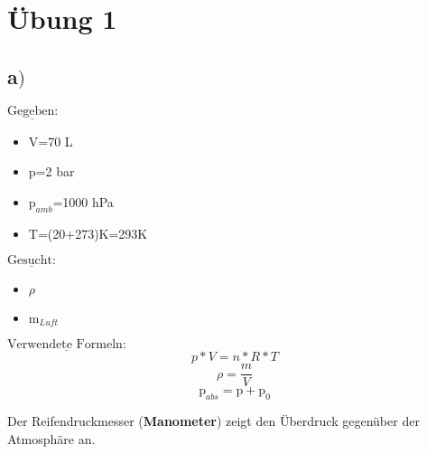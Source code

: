 \section{Übung 1}
\subsection*{a$)$}

\begin{minipage}[t]{0.33\textwidth}
$\underline{\text{Gegeben:}}$
\begin{itemize}
	\item V=70 \si{\liter}
	\item p=2 \si{\bar}
	\item $\text{p}_{amb}$=1000 \si{\hecto\pascal}
	\item T=(20+273)\si{\kelvin}=293\si{\kelvin}
\end{itemize}
\end{minipage}
\begin{minipage}[t]{0.33\textwidth}
	$\underline{\text{Gesucht:}}$
	\begin{itemize}
		\item $\rho$
		\item m$_{Luft}$
	\end{itemize}
\end{minipage}
\begin{minipage}[t]{0.33\textwidth}
	$\underline{\text{Verwendete Formeln:}}$
	\begin{equation}
	p*V=n*R*T
	\end{equation}
	\begin{equation}
	\rho =\frac{m}{V}
	\end{equation}
	\begin{equation}
	\text{p}_{abs} =\text{p}+\text{p}_0
	\end{equation}
\end{minipage}

\vspace{1cm}

Der Reifendruckmesser (\textbf{Manometer}) zeigt den Überdruck gegenüber der Atmosphäre an.

